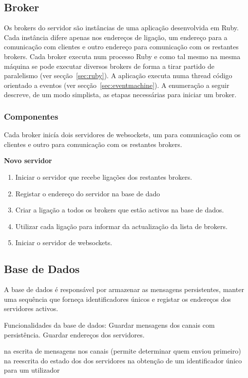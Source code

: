 \subsection{Broker}

Os brokers do servidor são instâncias de uma aplicação desenvolvida em Ruby. Cada instância difere apenas nos endereços de ligação, um endereço para a comunicação com clientes e outro endereço para comunicação com os restantes brokers.
Cada broker executa num processo Ruby e como tal mesmo na mesma máquina se pode executar diversos brokers de forma a tirar partido de paralelismo (ver secção~\ref{sec:ruby}).
A aplicação executa numa thread código orientado a eventos (ver secção~\ref{sec:eventmachine}). A enumeração a seguir descreve, de um modo simplista, as etapas necessárias para iniciar um broker.

\subsubsection{Componentes}
Cada broker inicía dois servidores de websockets, um para comunicação com os clientes e outro para comunicação com os restantes brokers.

\hl{}

\textbf{Novo servidor}
\begin{enumerate}
\item Iniciar o servidor que recebe ligações dos restantes brokers.
\item Registar o endereço do servidor na base de dado
\item Criar a ligação a todos os brokers que estão activos na base de dados.
\item Utilizar cada ligação para informar da actualização da lista de brokers.
\item Iniciar o servidor de websockets.
\end{enumerate}



\subsection{Base de Dados}
A base de dados é responsável por armazenar as mensagens persistentes, manter uma sequência que forneça identificadores únicos e registar os endereços dos servidores activos.

Funcionalidades da base de dados:
Guardar mensagens dos canais com persistência.
Guardar endereços dos servidores.

na escrita de mensagens nos canais (permite determinar quem enviou primeiro)
na reescrita do estado dos dos servidores
na obtenção de um identificador único para um utilizador

